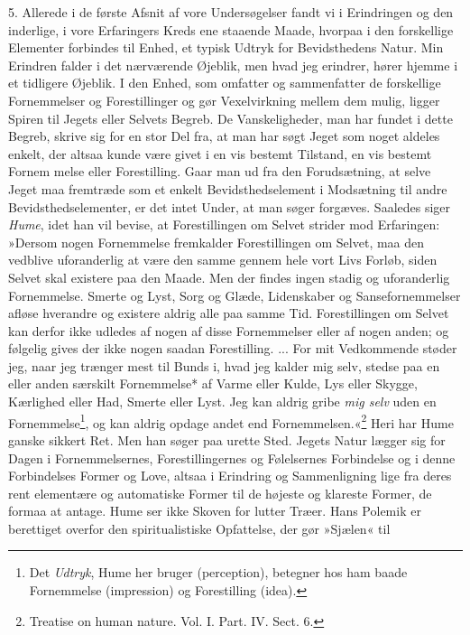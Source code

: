 \documentclass[12pt,a4paper,openany]{book}
\newcommand{\opage}[1]{\marginnote{\footnotesize\textit{[#1]}}}
\begin{document}
5. Allerede i de første Afsnit af vore Undersøgelser fandt vi i
Erindringen og den inderlige, i vore Erfaringers Kreds ene staaende
Maade, hvorpaa i den forskellige Elementer forbindes til Enhed, et
typisk Udtryk for Bevidsthedens Natur. Min Erindren falder i det
nærværende Øjeblik, men hvad jeg erindrer, hører hjemme i et tidligere
Øjeblik. I den Enhed, som omfatter og sammenfatter de forskellige
Fornemmelser og Forestillinger og gør Vexelvirkning mellem dem mulig,
ligger Spiren til Jegets eller Selvets Begreb. De Vanskeligheder, man
har fundet i dette Begreb, skrive sig for en stor Del fra, at man har
søgt Jeget som noget aldeles enkelt, der altsaa kunde være givet i en
vis bestemt Tilstand, en vis bestemt Fornem%
\opage{166}melse eller Forestilling. Gaar man ud fra den Forudsætning,
at selve Jeget maa fremtræde som et enkelt Bevidsthedselement i
Modsætning til andre Bevidsthedselementer, er det intet Under, at man
søger forgæves. Saaledes siger \emph{Hume}, idet han vil bevise, at
Forestillingen om Selvet strider mod Erfaringen: »Dersom nogen
Fornemmelse fremkalder Forestillingen om Selvet, maa den vedblive
uforanderlig at være den samme gennem hele vort Livs Forløb, siden
Selvet skal existere paa den Maade. Men der findes ingen stadig og
uforanderlig Fornemmelse. Smerte og Lyst, Sorg og Glæde, Lidenskaber og
Sansefornemmelser afløse hverandre og existere aldrig alle paa samme
Tid. Forestillingen om Selvet kan derfor ikke udledes af nogen af disse
Fornemmelser eller af nogen anden; og følgelig gives der ikke nogen
saadan Forestilling. ... For mit Vedkommende støder jeg, naar jeg
trænger mest til Bunds i, hvad jeg kalder mig selv, stedse paa en eller
anden særskilt Fornemmelse* af Varme eller Kulde, Lys eller Skygge,
Kærlighed eller Had, Smerte eller Lyst. Jeg kan aldrig gribe \emph{mig
selv} uden en Fornemmelse\footnote[1]{Det \emph{Udtryk}, Hume her bruger
(perception), betegner hos ham baade Fornemmelse (impression) og
Forestilling (idea).}, og kan aldrig opdage andet end
Fornemmelsen.«\footnote[2]{Treatise on human nature. Vol. I. Part. IV.
Sect. 6.} Heri har Hume ganske sikkert Ret. Men han søger paa urette
Sted. Jegets Natur lægger sig for Dagen i Fornemmelsernes,
Forestillingernes og Følelsernes Forbindelse og i denne Forbindelses
Former og Love, altsaa i Erindring og Sammenligning lige fra deres rent
elementære og automatiske Former til de højeste og klareste Former, de
formaa at antage. Hume ser ikke Skoven for lutter Træer. Hans Polemik er
berettiget overfor den spiritualistiske Opfattelse, der gør »Sjælen« til
\end{document}
